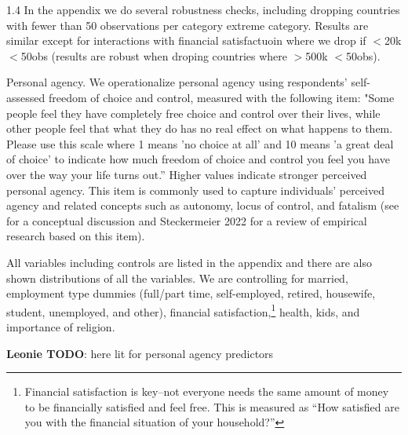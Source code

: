 \documentclass[10pt, letterpaper]{article}
\begin{document}
\begin{spacing}{1.4}
In the appendix we do several robustness checks, including dropping countries
with fewer than 50 observations per category extreme category.
Results are similar except for interactions with financial satisfactuoin where
we drop if $<$20k $<$50obs (results are robust when droping countries  where $>$500k $<$50obs).


Personal agency. We operationalize personal agency using respondents'
self-assessed freedom of choice and control, measured with the following item:
"Some people feel they have completely free choice and control over their lives,
while other people feel that what they do has no real effect on what happens to
them. Please use this scale where 1 means 'no choice at all' and 10 means 'a
great deal of choice' to indicate how much freedom of choice and control you
feel you have over the way your life turns out.'' Higher values indicate stronger
perceived personal agency. This item is commonly used to capture individuals'
perceived agency
\citep[e.g.,][]{verme09,inglehart08,veenhoven00_b,aok_free_from_to}
and related concepts such as autonomy, locus of control,
and fatalism (see \cite{kouba16} for a conceptual discussion and Steckermeier 2022
for a review of empirical research based on this item). 

All variables including controls are listed in the appendix and there are also shown distributions of all the variables. 
We are controlling for %
married, employment type dummies (full/part time, self-employed, retired, housewife, student, unemployed, and other),
financial satisfaction,\footnote{Financial satisfaction is key--not everyone needs the same amount of money to be financially satisfied and feel free. This is measured as ``How satisfied are you with the financial situation of your household?''} health, kids, and importance of religion.

\textbf{Leonie TODO}: here lit for personal agency predictors\\



\end{spacing}
\end{document}
